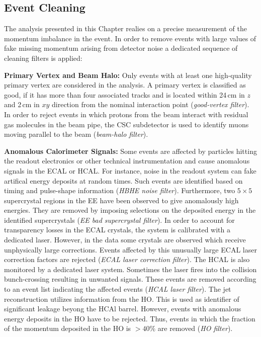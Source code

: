 \subsection{Event Cleaning}
\label{subsec:RA2_cleaning}
The analysis presented in this Chapter realies on a precise measurement of the momentum imbalance in the event. In order to remove events with large values of fake missing momentum arising from detector noise a dedicated sequence of cleaning filters is applied: 
\begin{description}
 \item{\textbf{Primary Vertex and Beam Halo:}} Only events with at least one high-quality primary vertex are considered in the analysis. A primary vertex is classified as good, if it has more than four associated tracks and is located within 24\,cm in $z$ and 2\,cm in $xy$ direction from the nominal interaction point (\textit{good-vertex filter}). In order to reject events in which protons from the beam interact with residual gas molecules in the beam pipe, the CSC subdetector is used to identify muons moving parallel to the beam (\textit{beam-halo filter}).
 \item{\textbf{Anomalous Calorimeter Signals:}} Some events are affected by particles hitting the readout electronics or other technical instrumentation and cause anomalous signals in the ECAL or HCAL. For instance, noise in the readout system can fake artifical energy deposits at random times. Such events are identified based on timing and pulse-shape information (\textit{HBHE noise filter}). Furthermore, two $5 \times 5 $ supercrystal regions in the EE have been observed to give anomalously high energies. They are removed by imposing selections on the deposited energy in the identified supercrystals (\textit{EE bad supercrystal filter}). In order to account for transparency losses in the ECAL crystals, the system is calibrated with a dedicated laser. However, in the data some crystals are observed which receive unphysically large corrections. Events affected by this unusually large ECAL laser correction factors are rejected (\textit{ECAL laser correction filter}). The HCAL is also monitored by a dedicated laser system. Sometimes the laser fires into the collision bunch-crossing resulting in unwanted signals. These events are removed according to an event list indicating the affected events (\textit{HCAL laser filter}). The jet reconstruction utilizes information from the HO. This is used as identifier of significant leakage beyong the HCAl barrel. However, events with anomalous energy deposits in the HO have to be rejected. Thus, events in which the fraction of the momentum deposited in the HO is $> 40\%$ are removed (\textit{HO filter}).

\end{description}
